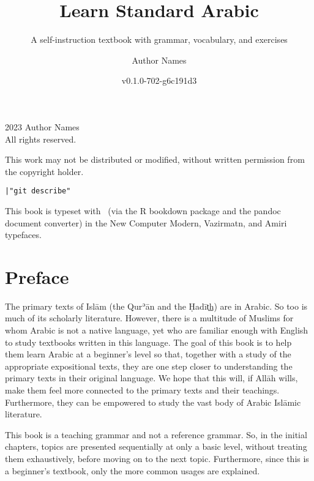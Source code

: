 \documentclass[
  10pt,
]{book}
\title{Learn Standard Arabic}
\subtitle{A self-instruction textbook with grammar, vocabulary, and exercises}
\author{Author Names}
\date{v0.1.0-702-g6c191d3}
\newcommand{\gitTag}{|"git describe"}
\renewcommand{\foreignlanguage}[2]{\oldforeignlanguage{#1}{\smash{#2}}}
\begin{document}
\maketitle

\thispagestyle{empty}
\begingroup
\footnotesize
\parindent 0pt
\parskip \baselineskip
\textcopyright{} 2023 Author Names \\
All rights reserved.

    This work may not be distributed or modified, without written permission from the copyright holder.

\texttt{\gitTag}

This book is typeset with \XeLaTeX\ (via the R bookdown package and the pandoc document converter)
in the New Computer Modern, Vazirmatn, and Amiri typefaces.


\vfill




\endgroup
\clearpage

{
\setcounter{tocdepth}{1}
\tableofcontents
}
\chapter*{Preface}\label{preface}


\foreignlanguage{arabic}{بسم الله الرحمن الرحيم}

The primary texts of Islām (the Qurʾān and the Ḥadīt͟h) are in Arabic. So too is much of its scholarly literature. However, there is a multitude of Muslims for whom Arabic is not a native language, yet who are familiar enough with English to study textbooks written in this language. The goal of this book is to help them learn Arabic at a beginner's level so that, together with a study of the appropriate expositional texts, they are one step closer to understanding the primary texts in their original language. We hope that this will, if Allāh wills, make them feel more connected to the primary texts and their teachings. Furthermore, they can be empowered to study the vast body of Arabic Islāmic literature.

This book is a teaching grammar and not a reference grammar. So, in the initial chapters, topics are presented sequentially at only a basic level, without treating them exhaustively, before moving on to the next topic. Furthermore, since this is a beginner's textbook, only the more common usages are explained.
\end{document}
